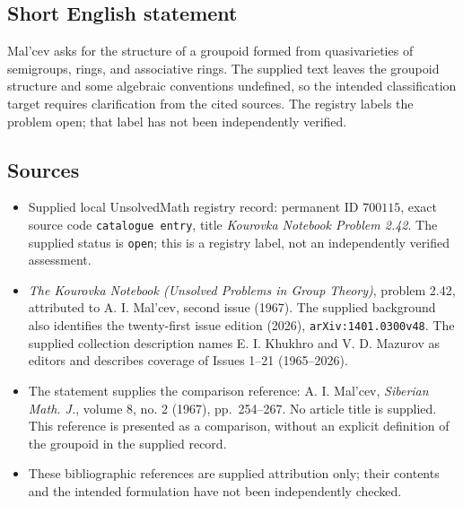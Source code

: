 \documentclass[11pt]{article}
\begin{document}
\subsection{Short English statement}
Mal'cev asks for the structure of a groupoid formed from quasivarieties of semigroups, rings, and associative rings. The supplied text leaves the groupoid structure and some algebraic conventions undefined, so the intended classification target requires clarification from the cited sources. The registry labels the problem open; that label has not been independently verified.
\subsection{Sources}
\begin{itemize}
\item Supplied local UnsolvedMath registry record: permanent ID \(700115\), exact source code \texttt{catalogue entry}, title \emph{Kourovka Notebook Problem 2.42}. The supplied status is \texttt{open}; this is a registry label, not an independently verified assessment.
\item \emph{The Kourovka Notebook (Unsolved Problems in Group Theory)}, problem 2.42, attributed to A. I. Mal'cev, second issue (1967). The supplied background also identifies the twenty-first issue edition (2026), \texttt{arXiv:1401.0300v48}. The supplied collection description names E. I. Khukhro and V. D. Mazurov as editors and describes coverage of Issues 1--21 (1965--2026).
\item The statement supplies the comparison reference: A. I. Mal'cev, \emph{Siberian Math. J.}, volume \(8\), no. \(2\) (1967), pp.\ 254--267. No article title is supplied. This reference is presented as a comparison, without an explicit definition of the groupoid in the supplied record.
\item These bibliographic references are supplied attribution only; their contents and the intended formulation have not been independently checked.
\end{itemize}
\end{document}
